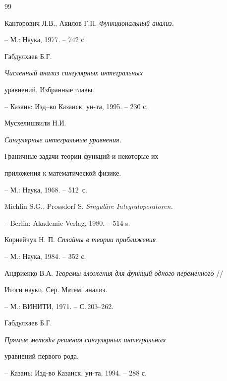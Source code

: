 \begin{thebibliography}{99}







Канторович Л.В., Акилов Г.П. {\it Функциональный анализ.}


-- М.: Наука, 1977. -- 742 с. 




Габдулхаев Б.Г. {\it Численный анализ сингулярных интегральных 


уравнений. Избранные главы.}


-- Казань: Изд--во Казанск. ун-та, 1995. -- 230 с. 




Мусхелишвили Н.И. {\it Сингулярные интегральные уравнения.


Граничные задачи теории функций и некоторые их


приложения к математической физике.}


-- М.: Наука, 1968. -- 512~с. 




Michlin S.G., Prossdorf S. {\it Singul\"are Integraloperatoren.}


-- Berlin: Akademic-Verlag, 1980. -- 514 s. 




Корнейчук Н. П. {\it Сплайны в теории приближения.}


-- М.: Наука, 1984. -- 352 с. 




Андриенко В.А. {\it Теоремы вложения для функций одного переменного} //


Итоги науки. Сер. Матем. анализ. 


-- М.: ВИНИТИ, 1971. -- С.\,203--262. 




Габдулхаев Б.Г. {\it Прямые методы решения сингулярных интегральных


уравнений первого рода. \/}


-- Казань: Изд-во Казанск. ун-та, 1994. -- 288 с. 





\end{thebibliography}





\vskip 2cm












\label{end}





